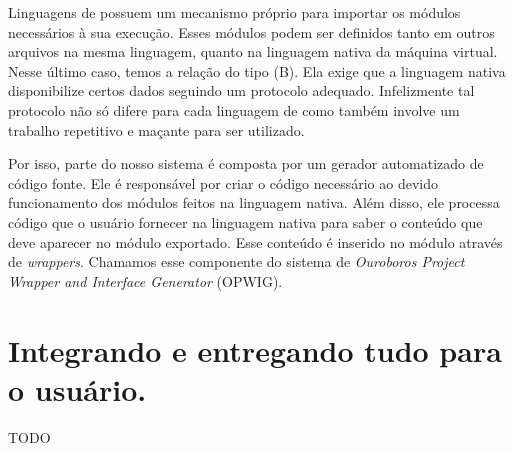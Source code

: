 
  Linguagens de \script{} possuem um mecanismo próprio para importar os módulos
  necessários à sua execução. Esses módulos podem ser definidos tanto em outros
  arquivos na mesma linguagem, quanto na linguagem nativa da máquina virtual.
  Nesse último caso, temos a relação do tipo (B). Ela exige que a linguagem
  nativa disponibilize certos dados seguindo um protocolo adequado. Infelizmente
  tal protocolo não só difere para cada linguagem de \script{} como também
  involve um trabalho repetitivo e maçante para ser utilizado. 
  
  Por isso, parte do nosso sistema é composta por um gerador automatizado de código fonte.
  Ele é responsável por criar o código necessário ao devido funcionamento dos módulos 
  feitos na linguagem nativa. Além disso, ele processa código que o usuário fornecer na
  linguagem nativa para saber o conteúdo que deve aparecer no módulo exportado.
  Esse conteúdo é inserido no módulo através de \emph{wrappers}. Chamamos esse componente
  do sistema de \emph{Ouroboros Project Wrapper and Interface Generator} (OPWIG).
  
  
  \section{Integrando e entregando tudo para o usuário.}
  \label{sec:estrutura:integration}
  TODO
